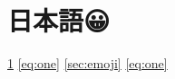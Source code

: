 

\section{日本語😀}
\label{sec:emoji}
\ref{sec:emoji}
\eqref{eq:one}
\autoref{sec:emoji}
\cref{eq:one}
\cite{alpha,beta}
\citet{gamma}
\citep{delta}
\parencite{epsilon}
\textcite{zeta}


